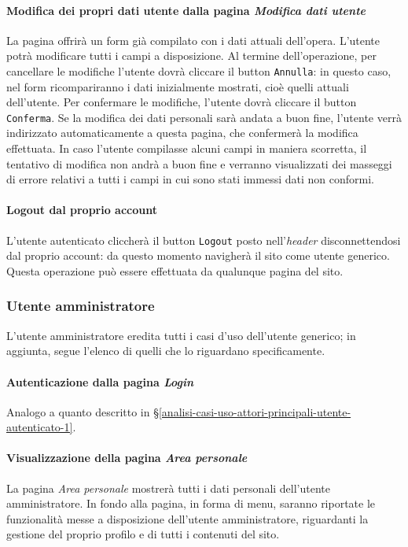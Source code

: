 \paragraph{Modifica dei propri dati utente dalla pagina \textit{Modifica dati utente}}
\label{analisi-casi-uso-attori-principali-utente-autenticato-9}
La pagina offrirà un form già compilato con i dati attuali dell'opera. L'utente potrà modificare tutti i campi a disposizione. Al termine dell'operazione, per cancellare le modifiche l'utente dovrà cliccare il button \texttt{Annulla}: in questo caso, nel form ricompariranno i dati inizialmente mostrati, cioè quelli attuali dell'utente. Per confermare le modifiche, l'utente dovrà cliccare il button \texttt{Conferma}. Se la modifica dei dati personali sarà andata a buon fine, l'utente verrà indirizzato automaticamente a questa pagina, che confermerà la modifica effettuata. In caso l'utente compilasse alcuni campi in maniera scorretta, il tentativo di modifica non andrà a buon fine e verranno visualizzati dei masseggi di errore relativi a tutti i campi in cui sono stati immessi dati non conformi.


\paragraph{Logout dal proprio account}
\label{analisi-casi-uso-attori-principali-utente-autenticato-10}
L'utente autenticato cliccherà il button \texttt{Logout} posto nell'\textit{header} disconnettendosi dal proprio account: da questo momento navigherà il sito come utente generico. Questa operazione può essere effettuata da qualunque pagina del sito.


\subsubsection{Utente amministratore}
\label{analisi-casi-uso-attori-principali-utente-amministratore}
L'utente amministratore eredita tutti i casi d'uso dell'utente generico; in aggiunta, segue l'elenco  di quelli che lo riguardano specificamente.


\paragraph{Autenticazione dalla pagina \textit{Login}}
\label{analisi-casi-uso-attori-principali-utente-amministratore-1}
Analogo a quanto descritto in §\ref{analisi-casi-uso-attori-principali-utente-autenticato-1}.


\paragraph{Visualizzazione della pagina \textit{Area personale}}
\label{analisi-casi-uso-attori-principali-utente-amministratore-2}
La pagina \textit{Area personale} mostrerà tutti i dati personali dell'utente amministratore. In fondo alla pagina, in forma di menu, saranno riportate le funzionalità messe a disposizione dell'utente amministratore, riguardanti la gestione del proprio profilo e di tutti i contenuti del sito.


